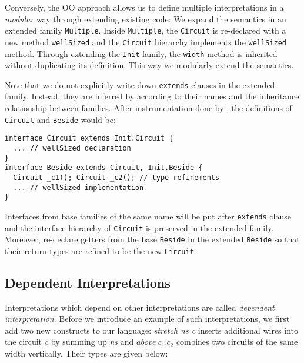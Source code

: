 Conversely, the OO approach allows us to define multiple interpretations in a
\emph{modular} way through extending existing code:
We expand the semantics in an extended family \texttt{Multiple}.
Inside \texttt{Multiple}, the \texttt{Circuit} is re-declared
with a new method \texttt{wellSized} and the \texttt{Circuit} hierarchy
implements the \texttt{wellSized} method.
Through extending the \texttt{Init} family, the \texttt{width} method is
inherited without duplicating its definition. This way we modularly extend the
semantics.

Note that we do not explicitly write down \texttt{extends} clauses in the
extended family.
Instead, they are inferred by \name according to their
names and the inheritance relationship between families.
After instrumentation done by \name, the definitions of \texttt{Circuit} and \texttt{Beside}
would be:

\begin{lstlisting}
interface Circuit extends Init.Circuit {
  ... // wellSized declaration
}
interface Beside extends Circuit, Init.Beside {
  Circuit _c1(); Circuit _c2(); // type refinements
  ... // wellSized implementation
}
\end{lstlisting}
Interfaces from base families of the same name will be put after \texttt{extends} clause and the
interface hierarchy of \texttt{Circuit} is preserved in the extended family.
Moreover, \name re-declare getters from the base \texttt{Beside} in the extended
\texttt{Beside} so that their return types are refined to be the new
\texttt{Circuit}.

\subsection{Dependent Interpretations}
Interpretations which depend on other interpretations are called \emph{dependent
  interpretation}. %
Before we introduce an example of such interpretations, we first add two new
constructs to our language:
\emph{stretch ns c} inserts additional wires into the circuit \emph{c} by
summing up \emph{ns} and $above\ c_1\ c_2$ combines two circuits of the same width vertically.
Their types are given below:



